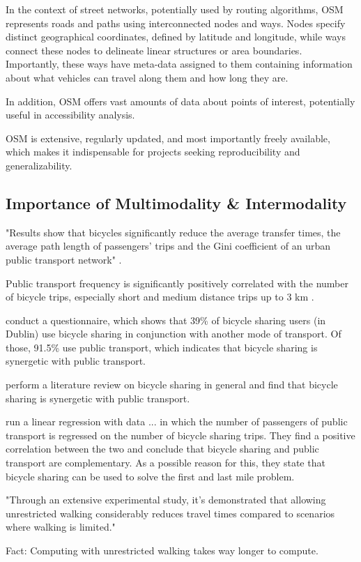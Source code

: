 In the context of street networks, potentially used by routing algorithms, OSM represents roads and paths using interconnected nodes and ways.
Nodes specify distinct geographical coordinates, defined by latitude and longitude, while ways connect these nodes to delineate linear structures or area boundaries.
Importantly, these ways have meta-data assigned to them containing information about what vehicles can travel along them and how long they are.

In addition, OSM offers vast amounts of data about points of interest, potentially useful in accessibility analysis.

OSM is extensive, regularly updated, and most importantly freely available, which makes it indispensable for projects seeking reproducibility and generalizability.


\subsection{Importance of Multimodality \& Intermodality}
\label{subsec:importance_of_multimodality_and_intermodality}

"Results show that bicycles significantly reduce the average transfer times, the average path length of passengers’ trips and the Gini coefficient of an urban public transport network" \cite{yangImpactPublicBicyclesharing2018}.

Public transport frequency is significantly positively correlated with the number of bicycle trips, especially short and medium distance trips up to 3 km \cite{radzimskiExploringRelationshipBikesharing2021a}.

\cite{murphyRoleBicyclesharingCity2015} conduct a questionnaire, which shows that 39\% of bicycle sharing users (in Dublin) use bicycle sharing in conjunction with another mode of transport. Of those, 91.5\% use public transport, which indicates that bicycle sharing is synergetic with public transport.

\cite{fishmanBikeShareSynthesis2013} perform a literature review on bicycle sharing in general and find that bicycle sharing is synergetic with public transport.

\cite{maBicycleSharingPublic2015} run a linear regression with data ...
in which the number of passengers of public transport is regressed on the number of bicycle sharing trips.
They find a positive correlation between the two and conclude that bicycle sharing and public transport are complementary.
As a possible reason for this, they state that bicycle sharing can be used to solve the first and last mile problem.

"Through an extensive experimental study, it's demonstrated that allowing unrestricted walking considerably reduces travel times compared to scenarios where walking is limited." \cite{wagnerPublicTransitRouting2017}

Fact: Computing with unrestricted walking takes way longer to compute. \cite{wagnerPublicTransitRouting2017}
